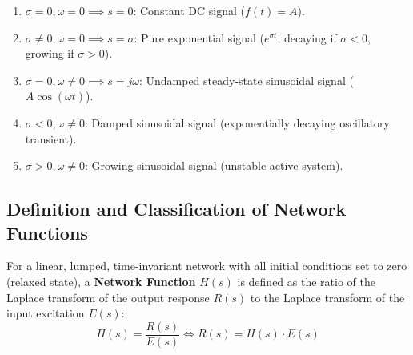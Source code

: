 \documentclass[12pt,a4paper]{article}
\begin{document}
\begin{tcolorbox}[formulabox, title={\textbf{Special Cases of the Complex Frequency Variable $s = \sigma + j\omega$}}]
\begin{enumerate}[leftmargin=*]
  \item $\sigma = 0, \omega = 0 \implies s = 0$: Constant DC signal ($f(t) = A$).
  \item $\sigma \ne 0, \omega = 0 \implies s = \sigma$: Pure exponential signal ($e^{\sigma t}$; decaying if $\sigma < 0$, growing if $\sigma > 0$).
  \item $\sigma = 0, \omega \ne 0 \implies s = j\omega$: Undamped steady-state sinusoidal signal ($A\cos(\omega t)$).
  \item $\sigma < 0, \omega \ne 0$: Damped sinusoidal signal (exponentially decaying oscillatory transient).
  \item $\sigma > 0, \omega \ne 0$: Growing sinusoidal signal (unstable active system).
\end{enumerate}
\end{tcolorbox}

\subsection{Definition and Classification of Network Functions}

\begin{tcolorbox}[defbox, title={\textbf{Network Function Definition}}]
For a linear, lumped, time-invariant network with all initial conditions set to zero (relaxed state), a \textbf{Network Function} $H(s)$ is defined as the ratio of the Laplace transform of the output response $R(s)$ to the Laplace transform of the input excitation $E(s)$:
\begin{equation}
  H(s) = \frac{R(s)}{E(s)} \iff R(s) = H(s) \cdot E(s)
\end{equation}
\end{tcolorbox}
\end{document}
